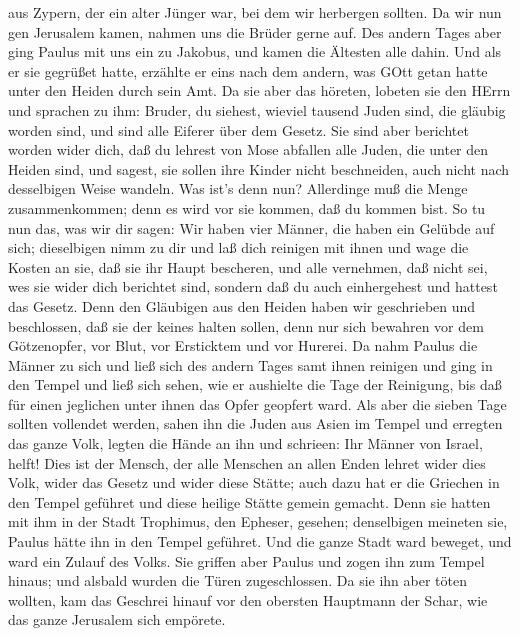 aus Zypern, der ein alter Jünger war, bei dem wir herbergen sollten.
 Da wir nun gen Jerusalem kamen, nahmen uns die Brüder
gerne auf.  Des andern Tages aber ging Paulus mit uns ein
zu Jakobus, und kamen die Ältesten alle dahin.  Und als er
sie gegrüßet hatte, erzählte er eins nach dem andern, was GOtt getan
hatte unter den Heiden durch sein Amt.  Da sie aber das
höreten, lobeten sie den HErrn und sprachen zu ihm: Bruder, du siehest,
wieviel tausend Juden sind, die gläubig worden sind, und sind alle
Eiferer über dem Gesetz.  Sie sind aber berichtet worden
wider dich, daß du lehrest von Mose abfallen alle Juden, die unter den
Heiden sind, und sagest, sie sollen ihre Kinder nicht beschneiden, auch
nicht nach desselbigen Weise wandeln.  Was ist's denn nun?
Allerdinge muß die Menge zusammenkommen; denn es wird vor sie kommen,
daß du kommen bist.  So tu nun das, was wir dir sagen:
 Wir haben vier Männer, die haben ein Gelübde auf sich;
dieselbigen nimm zu dir und laß dich reinigen mit ihnen und wage die
Kosten an sie, daß sie ihr Haupt bescheren, und alle vernehmen, daß
nicht sei, wes sie wider dich berichtet sind, sondern daß du auch
einhergehest und hattest das Gesetz.  Denn den Gläubigen
aus den Heiden haben wir geschrieben und beschlossen, daß sie der keines
halten sollen, denn nur sich bewahren vor dem Götzenopfer, vor Blut, vor
Ersticktem und vor Hurerei.  Da nahm Paulus die Männer zu
sich und ließ sich des andern Tages samt ihnen reinigen und ging in den
Tempel und ließ sich sehen, wie er aushielte die Tage der Reinigung, bis
daß für einen jeglichen unter ihnen das Opfer geopfert ward.
 Als aber die sieben Tage sollten vollendet werden, sahen
ihn die Juden aus Asien im Tempel und erregten das ganze Volk, legten
die Hände an ihn und schrieen:  Ihr Männer von Israel,
helft! Dies ist der Mensch, der alle Menschen an allen Enden lehret
wider dies Volk, wider das Gesetz und wider diese Stätte; auch dazu hat
er die Griechen in den Tempel geführet und diese heilige Stätte gemein
gemacht.  Denn sie hatten mit ihm in der Stadt Trophimus,
den Epheser, gesehen; denselbigen meineten sie, Paulus hätte ihn in den
Tempel geführet.  Und die ganze Stadt ward beweget, und
ward ein Zulauf des Volks. Sie griffen aber Paulus und zogen ihn zum
Tempel hinaus; und alsbald wurden die Türen zugeschlossen. 
Da sie ihn aber töten wollten, kam das Geschrei hinauf vor den obersten
Hauptmann der Schar, wie das ganze Jerusalem sich empörete.
